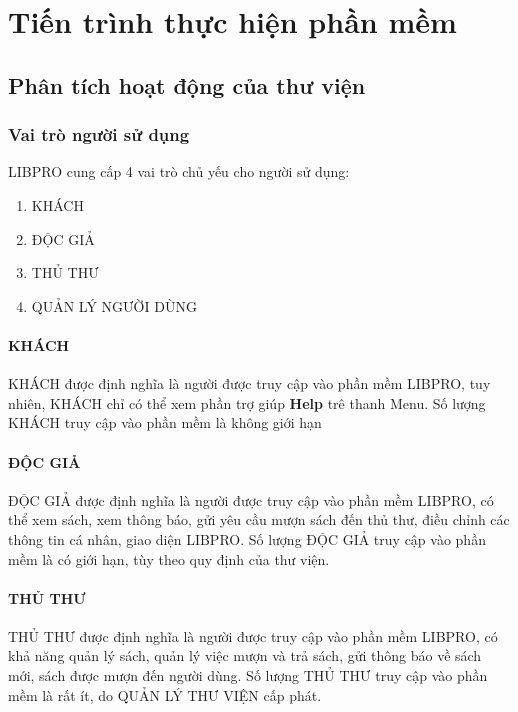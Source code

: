 \documentclass[12pt,a4paper]{report}
\begin{document}
\chapter{Tiến trình thực hiện phần mềm}
    \section{Phân tích hoạt động của thư viện}
        \subsection{Vai trò người sử dụng}
        LIBPRO cung cấp 4 vai trò chủ yếu cho người sử dụng:
        \begin{enumerate}
            \item KHÁCH
            \item ĐỘC GIẢ
            \item THỦ THƯ
            \item QUẢN LÝ NGƯỜI DÙNG
        \end{enumerate}
            \subsubsection{KHÁCH}
                KHÁCH được định nghĩa là người được truy cập vào phần mềm LIBPRO, tuy nhiên, KHÁCH chỉ có thể xem phần trợ giúp \textbf{Help} trê thanh Menu. Số lượng KHÁCH truy cập vào phần mềm là không giới hạn
            \subsubsection{ĐỘC GIẢ}
                ĐỘC GIẢ được định nghĩa là người được truy cập vào phần mềm LIBPRO, có thể xem sách, xem thông báo, gửi yêu cầu mượn sách đến thủ thư, điều chỉnh các thông tin cá nhân, giao diện LIBPRO.
                Số lượng ĐỘC GIẢ truy cập vào phần mềm là có giới hạn, tùy theo quy định của thư viện.
            \subsubsection{THỦ THƯ}
                THỦ THƯ được định nghĩa là người được truy cập vào phần mềm LIBPRO, có khả năng quản lý sách, quản lý việc mượn và trả sách, gửi thông báo về sách mới, sách được mượn đến người dùng.
                Số lượng THỦ THƯ truy cập vào phần mềm là rất ít, do QUẢN LÝ THƯ VIỆN cấp phát.
\end{document}

